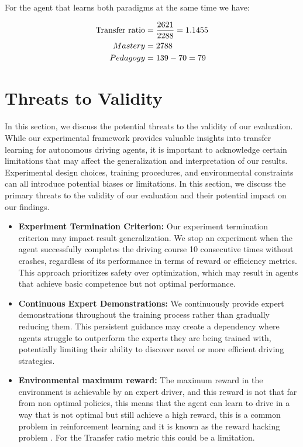 For the agent that learns both paradigms at the same time we have:

\begin{equation}
   \centering
    \begin{split}
        \text{Transfer ratio} & = \frac{2621}{2288} = 1.1455 \\
        Mastery               & = 2788                                         \\
        Pedagogy              & = 139 - 70 = 79\\
    \end{split}
\end{equation}

\section{Threats to Validity}
\label{sec:threats}
In this section, we discuss the potential threats to the validity of our evaluation. While our experimental framework provides valuable insights into transfer learning for autonomous driving agents, it is important to acknowledge certain limitations that may affect the generalization and interpretation of our results. Experimental design choices, training procedures, and environmental constraints can all introduce potential biases or limitations. In this section, we discuss the primary threats to the validity of our evaluation and their potential impact on our findings.
\begin{itemize}
\item \textbf{Experiment Termination Criterion:} Our experiment termination criterion may impact result generalization. We stop an experiment when the agent successfully completes the driving course 10 consecutive times without crashes, regardless of its performance in terms of reward or efficiency metrics. This approach prioritizes safety over optimization, which may result in agents that achieve basic competence but not optimal performance.
\item \textbf{Continuous Expert Demonstrations:} We continuously provide expert demonstrations throughout the training process rather than gradually reducing them. This persistent guidance may create a dependency where agents struggle to outperform the experts they are being trained with, potentially limiting their ability to discover novel or more efficient driving strategies.

\item \textbf{Environmental maximum reward:} The maximum reward in the environment is achievable by an expert driver, and this reward is not that far from non optimal policies, this means that the agent can learn to drive in a way that is not optimal but still achieve a high reward, this is a common problem in reinforcement learning and it is known as the reward hacking problem \cite{reward_hacking}. For the Transfer ratio metric this could be a limitation.
\end{itemize}
